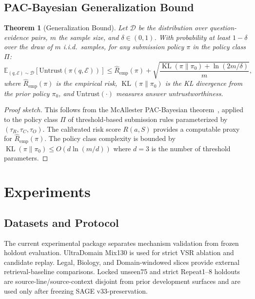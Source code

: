 \documentclass[journal,onecolumn,11pt]{IEEEtran}
\newtheorem{theorem}{Theorem}
\begin{document}
\subsection{PAC-Bayesian Generalization Bound}

\begin{theorem}[Generalization Bound]
\label{thm:rcs}
Let $\mathcal{D}$ be the distribution over question-evidence pairs, $m$ the sample size, and $\delta \in (0, 1)$. With probability at least $1 - \delta$ over the draw of $m$ i.i.d.\ samples, for any submission policy $\pi$ in the policy class $\Pi$:
\begin{equation}
\mathbb{E}_{(q, \mathcal{E}) \sim \mathcal{D}}[\text{Untrust}(\pi(q, \mathcal{E}))] \leq \hat{R}_{\text{emp}}(\pi) + \sqrt{\frac{\operatorname{KL}(\pi \| \pi_0) + \ln(2m/\delta)}{m}},
\end{equation}
where $\hat{R}_{\text{emp}}(\pi)$ is the empirical risk, $\operatorname{KL}(\pi \| \pi_0)$ is the KL divergence from the prior policy $\pi_0$, and $\text{Untrust}(\cdot)$ measures answer untrustworthiness.
\end{theorem}

\begin{proof}[Proof sketch]
This follows from the McAllester PAC-Bayesian theorem~\cite{mcallester1999pac}, applied to the policy class $\Pi$ of threshold-based submission rules parameterized by $(\tau_R, \tau_C, \tau_O)$. The calibrated risk score $R(a, S)$ provides a computable proxy for $\hat{R}_{\text{emp}}(\pi)$. The policy class complexity is bounded by $\operatorname{KL}(\pi \| \pi_0) \leq O(d \ln(m/d))$ where $d = 3$ is the number of threshold parameters.
\end{proof}


\section{Experiments}
\label{sec:experiments}

\subsection{Datasets and Protocol}

The current experimental package separates mechanism validation from frozen holdout evaluation. UltraDomain Mix130 is used for strict VSR ablation and candidate replay. Legal, Biology, and Domain-windowed slices provide external retrieval-baseline comparisons. Locked unseen75 and strict Repeat1--8 holdouts are source-line/source-context disjoint from prior development surfaces and are used only after freezing SAGE v33-preservation.
\end{document}
